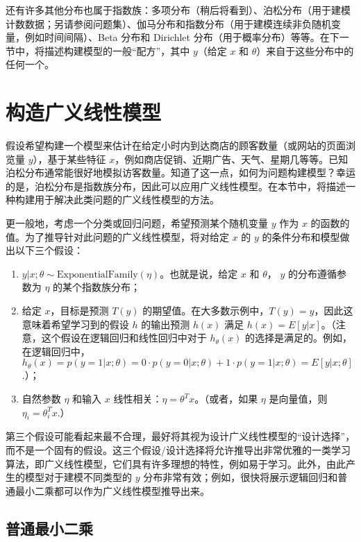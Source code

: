 还有许多其他分布也属于指数族：多项分布（稍后将看到）、泊松分布（用于建模计数数据；另请参阅问题集）、伽马分布和指数分布（用于建模连续非负随机变量，例如时间间隔）、Beta 分布和 Dirichlet 分布（用于概率分布）等等。在下一节中，将描述构建模型的一般“配方”，其中 $y$（给定 $x$ 和 $\theta$）来自于这些分布中的任何一个。


\section{构造广义线性模型}

假设希望构建一个模型来估计在给定小时内到达商店的顾客数量（或网站的页面浏览量 $y$），基于某些特征 $x$，例如商店促销、近期广告、天气、星期几等等。已知泊松分布通常能很好地模拟访客数量。知道了这一点，如何为问题构建模型？幸运的是，泊松分布是指数族分布，因此可以应用广义线性模型。在本节中，将描述一种构建用于解决此类问题的广义线性模型的方法。

更一般地，考虑一个分类或回归问题，希望预测某个随机变量 $y$ 作为 $x$ 的函数的值。为了推导针对此问题的广义线性模型，将对给定 $x$ 的 $y$ 的条件分布和模型做出以下三个假设：

\begin{enumerate}
    \item $y|x; \theta \sim \text{ExponentialFamily}(\eta)$。也就是说，给定 $x$ 和 $\theta$， $y$ 的分布遵循参数为 $\eta$ 的某个指数族分布；
    \item 给定 $x$，目标是预测 $T(y)$ 的期望值。在大多数示例中，$T(y)=y$，因此这意味着希望学习到的假设 $h$ 的输出预测 $h(x)$ 满足 $h(x) = E[y|x]$。（注意，这个假设在逻辑回归和线性回归中对于 $h_\theta(x)$ 的选择是满足的。例如，在逻辑回归中，$h_\theta(x) = p(y=1|x; \theta) = 0 \cdot p(y=0|x; \theta) + 1 \cdot p(y=1|x; \theta) = E[y|x; \theta]$.）；
    \item 自然参数 $\eta$ 和输入 $x$ 线性相关：$\eta = \theta^T x$。（或者，如果 $\eta$ 是向量值，则 $\eta_i = \theta_i^T x$.）
\end{enumerate}

第三个假设可能看起来最不合理，最好将其视为设计广义线性模型的“设计选择”，而不是一个固有的假设。这三个假设/设计选择将允许推导出非常优雅的一类学习算法，即广义线性模型，它们具有许多理想的特性，例如易于学习。此外，由此产生的模型对于建模不同类型的 $y$ 分布非常有效；例如，很快将展示逻辑回归和普通最小二乘都可以作为广义线性模型推导出来。

\subsection{普通最小二乘}

